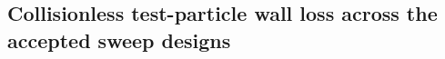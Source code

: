 %
%
\subsection{Collisionless test-particle wall loss across the accepted sweep designs}
\label{sec:wall-loss-geometry-screening-v1}

